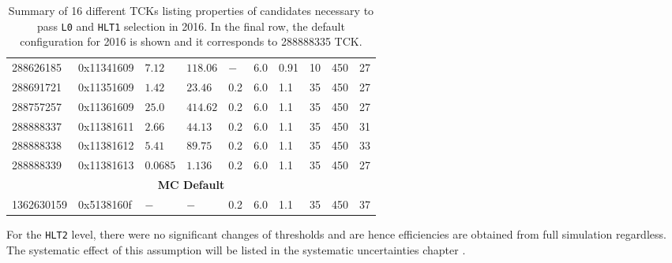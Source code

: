 \begin{table}
\begin{center}
\begin{tabular}{l l l l | l l l l | l l }
      288626185 & 0x11341609 & $7.12$ &  $118.06$  &  $-$ & 6.0 & 0.91 & 10 & 450 & 27 \\%
      288691721 & 0x11351609 &  $1.42$ &  $23.46$   &  0.2 & 6.0 & 1.1  & 35  & 450 & 27 \\%
      288757257 & 0x11361609 & $25.0$ &  $414.62$   &  0.2 & 6.0 & 1.1  & 35 & 450 & 27  \\%
      288888337 & 0x11381611 & $ 2.66$ &  $44.13$  &  0.2 & 6.0 & 1.1  & 35  & 450 & 31 \\%
      288888338 & 0x11381612 & $5.41$ &  $89.75$  &  0.2 & 6.0 & 1.1  & 35  & 450 & 33 \\%
      288888339 & 0x11381613 & $0.0685$ &  $1.136$  &  0.2 & 6.0 & 1.1  & 35  & 450 & 27 \\%
      \multicolumn{10}{c}{\textbf{MC Default}} \\
      1362630159 & 0x5138160f & $-$  & $-$   & 0.2 & 6.0 & 1.1  & 35 & 450 & 37\\%

   \end{tabular}
\caption{Summary of 16 different TCKs listing properties of candidates necessary to pass \texttt{L0} and \texttt{HLT1} selection in 2016. In the final row, the default configuration for 2016 is shown and it corresponds to 288888335 TCK.}
\label{tab:2016MC}
	\end{center}
\end{table}

For the \texttt{HLT2} level, there were no significant changes of thresholds and are hence efficiencies are obtained from full simulation regardless. The systematic effect of this assumption will be listed in the systematic uncertainties chapter .







